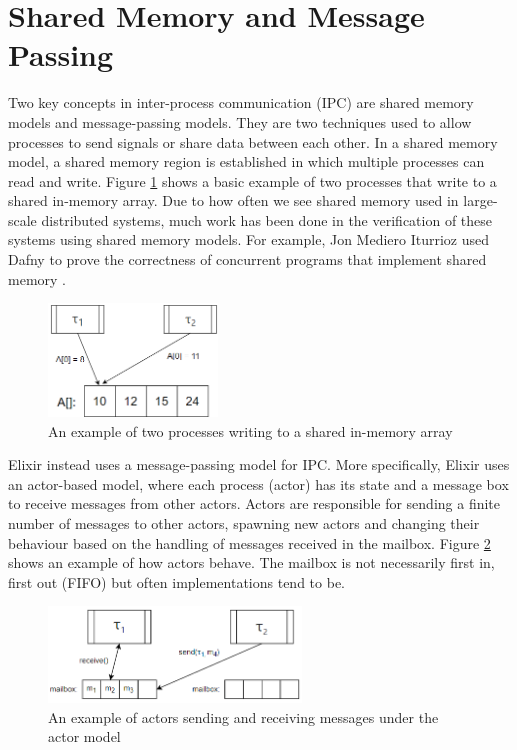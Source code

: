 \section{Shared Memory and Message Passing}
Two key concepts in inter-process communication (IPC) are shared memory models and message-passing models. They are two techniques used to allow processes to send signals or share data between each other. In a shared memory model, a shared memory region is established in which multiple processes can read and write. Figure \ref{fig:shared_memory} shows a basic example of two processes that write to a shared in-memory array. Due to how often we see shared memory used in large-scale distributed systems, much work has been done in the verification of these systems using shared memory models. For example, Jon Mediero Iturrioz used Dafny \cite{dafny} to prove the correctness of concurrent programs that implement shared memory \cite{shared_memory_verification}. 
\begin{figure}[h]
    \centering
    \includegraphics[width=0.4\textwidth]{images/shared_memory.png}
    \caption{An example of two processes writing to a shared in-memory array}
    \label{fig:shared_memory}
\end{figure}
\par
Elixir instead uses a message-passing model for IPC. More specifically, Elixir uses an actor-based model, where each process (actor) has its state and a message box to receive messages from other actors. Actors are responsible for sending a finite number of messages to other actors, spawning new actors and changing their behaviour based on the handling of messages received in the mailbox. Figure \ref{fig:actor_model} shows an example of how actors behave. The mailbox is not necessarily first in, first out (FIFO) but often implementations tend to be.
\begin{figure}[H]
    \centering
    \includegraphics[width=0.6\textwidth]{images/actor_model.png}
    \caption{An example of actors sending and receiving messages under the actor model}
    \label{fig:actor_model}
\end{figure}
